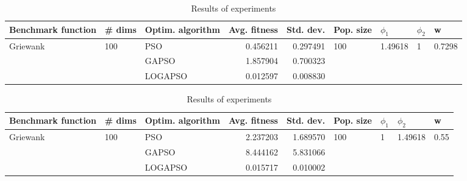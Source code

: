 \documentclass{article}
\begin{document}
\begin{table}
\centering
\caption{Results of experiments}
\begin{tabular}{lllrrllll}
\toprule
       Benchmark function &              \# dims & Optim. algorithm &  Avg. fitness &  Std. dev. &            Pop. size &               $\phi_{1}$ &         $\phi_{2}$ &                       w \\
\midrule
\multirow{3}{*}{Griewank} & \multirow{3}{*}{100} &              PSO &      0.456211 &   0.297491 & \multirow{3}{*}{100} & \multirow{3}{*}{1.49618} & \multirow{3}{*}{1} & \multirow{3}{*}{0.7298} \\
                          &                      &            GAPSO &      1.857904 &   0.700323 &                      &                          &                    &                         \\
                          &                      &          LOGAPSO &      0.012597 &   0.008830 &                      &                          &                    &                         \\
\bottomrule
\end{tabular}
\end{table}
\begin{table}
\centering
\caption{Results of experiments}
\begin{tabular}{lllrrllll}
\toprule
       Benchmark function &              \# dims & Optim. algorithm &  Avg. fitness &  Std. dev. &            Pop. size &         $\phi_{1}$ &               $\phi_{2}$ &                     w \\
\midrule
\multirow{3}{*}{Griewank} & \multirow{3}{*}{100} &              PSO &      2.237203 &   1.689570 & \multirow{3}{*}{100} & \multirow{3}{*}{1} & \multirow{3}{*}{1.49618} & \multirow{3}{*}{0.55} \\
                          &                      &            GAPSO &      8.444162 &   5.831066 &                      &                    &                          &                       \\
                          &                      &          LOGAPSO &      0.015717 &   0.010002 &                      &                    &                          &                       \\
\bottomrule
\end{tabular}
\end{table}
\end{document}
